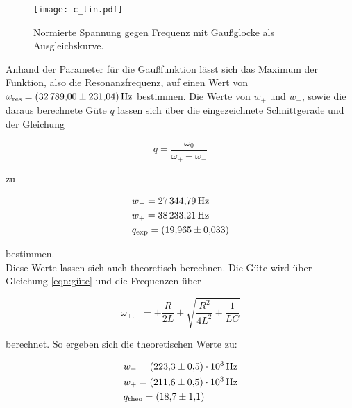 \begin{figure}[H]
    \texttt{[image: c\_lin.pdf]}
    \caption{Normierte Spannung gegen Frequenz mit Gaußglocke als Ausgleichskurve.}
\end{figure}

\noindent Anhand der Parameter für die Gaußfunktion lässt sich das Maximum der Funktion, also die Resonanzfrequenz, auf einen Wert von 
$\omega_\text{res} = \qty{32789.00 \pm 231.04}{\hertz}$ bestimmen.
Die Werte von $w_+$ und $w_-$, sowie die daraus berechnete Güte $q$ lassen sich über die eingezeichnete Schnittgerade und der Gleichung

\begin{equation*}
    q = \frac{\omega_0}{\omega_+ - \omega_-}
\end{equation*}

\noindent zu 

\begin{align}
    &w_- = \qty{27344.79}{\hertz} \\
    &w_+ = \qty{38233.21}{\hertz} \\
    &q_\text{exp}   = \qty{19.965 \pm 0.033}{}
\end{align}

\noindent bestimmen. \\
\noindent Diese Werte lassen sich auch theoretisch berechnen. Die Güte wird über Gleichung \eqref{eqn:güte} und die Frequenzen über

\begin{equation*}
    \omega_{+,-}= \pm \frac{R}{2L} + \sqrt{\frac{R^2}{4L^2} +\frac{1}{LC}}
\end{equation*}

\noindent berechnet. So ergeben sich die theoretischen Werte zu:

\begin{align}
    &w_- = \qty{223.3 \pm 0.5 e3}{\hertz} \\
    &w_+ = \qty{211.6 \pm 0.5 e3}{\hertz} \\
    &q_\text{theo} = \qty{18.7 \pm 1.1}{}
\end{align}


%
